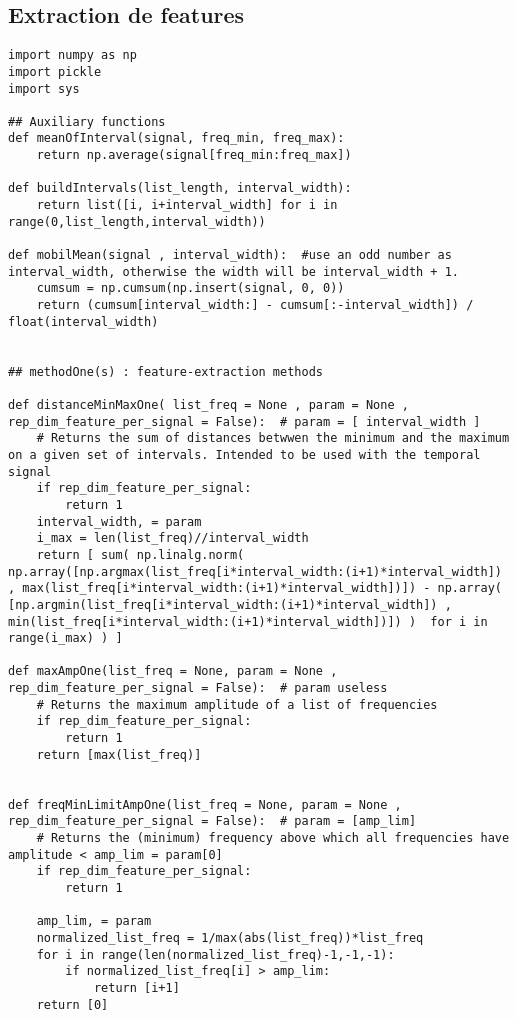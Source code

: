 \documentclass{article}
\begin{document}
\subsection{Extraction de features}
\begin{lstlisting}
import numpy as np
import pickle
import sys

## Auxiliary functions
def meanOfInterval(signal, freq_min, freq_max):
    return np.average(signal[freq_min:freq_max])
    
def buildIntervals(list_length, interval_width):
    return list([i, i+interval_width] for i in range(0,list_length,interval_width))

def mobilMean(signal , interval_width):  #use an odd number as interval_width, otherwise the width will be interval_width + 1.
    cumsum = np.cumsum(np.insert(signal, 0, 0)) 
    return (cumsum[interval_width:] - cumsum[:-interval_width]) / float(interval_width)


## methodOne(s) : feature-extraction methods

def distanceMinMaxOne( list_freq = None , param = None , rep_dim_feature_per_signal = False):  # param = [ interval_width ]
    # Returns the sum of distances betwwen the minimum and the maximum on a given set of intervals. Intended to be used with the temporal signal
    if rep_dim_feature_per_signal:
        return 1
    interval_width, = param
    i_max = len(list_freq)//interval_width
    return [ sum( np.linalg.norm( np.array([np.argmax(list_freq[i*interval_width:(i+1)*interval_width]) , max(list_freq[i*interval_width:(i+1)*interval_width])]) - np.array( [np.argmin(list_freq[i*interval_width:(i+1)*interval_width]) , min(list_freq[i*interval_width:(i+1)*interval_width])]) )  for i in range(i_max) ) ]  

def maxAmpOne(list_freq = None, param = None , rep_dim_feature_per_signal = False):  # param useless
    # Returns the maximum amplitude of a list of frequencies
    if rep_dim_feature_per_signal:
        return 1
    return [max(list_freq)]


def freqMinLimitAmpOne(list_freq = None, param = None , rep_dim_feature_per_signal = False):  # param = [amp_lim]
    # Returns the (minimum) frequency above which all frequencies have amplitude < amp_lim = param[0]
    if rep_dim_feature_per_signal:
        return 1
    
    amp_lim, = param
    normalized_list_freq = 1/max(abs(list_freq))*list_freq
    for i in range(len(normalized_list_freq)-1,-1,-1):
        if normalized_list_freq[i] > amp_lim:
            return [i+1]
    return [0]




\end{lstlisting}
\end{document}
